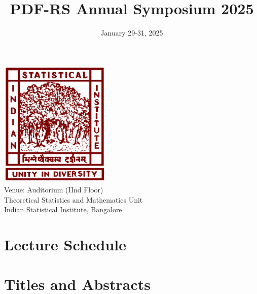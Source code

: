 \documentclass[a4paper,12pt]{article}
\title{\textbf{PDF-RS Annual Symposium 2025}}
\author{} %
\date{\vspace{-1.5cm}January 29-31, 2025}
\begin{document}
\maketitle
\thispagestyle{empty} %
\begin{center}
    \includegraphics[width=0.4\textwidth]{images/isi_logo.png} \\[1cm]
    Venue: Auditorium (IInd Floor) \\
    Theoretical Statistics and Mathematics Unit \\
    Indian Statistical Institute, Bangalore
\end{center}
\newpage

\section*{Lecture Schedule}

\newpage

\section*{Titles and Abstracts}


\end{document}
